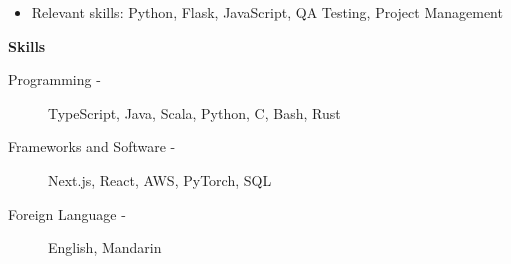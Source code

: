 \documentclass[11pt, oneside]{article}
\def\sectionheader #1{\vspace{15pt}\textbf{\Large #1}}
\begin{document}
\begin{itemize}
\item Relevant skills: Python, Flask, JavaScript, QA Testing, Project Management
\end{itemize}


\sectionheader{Skills}

\begin{description}
\item[Programming -] TypeScript, Java, Scala, Python, C, Bash, Rust

\item[Frameworks and Software -] Next.js, React, AWS, PyTorch, SQL

\item[Foreign Language -] English, Mandarin
\end{description}
\end{document}

